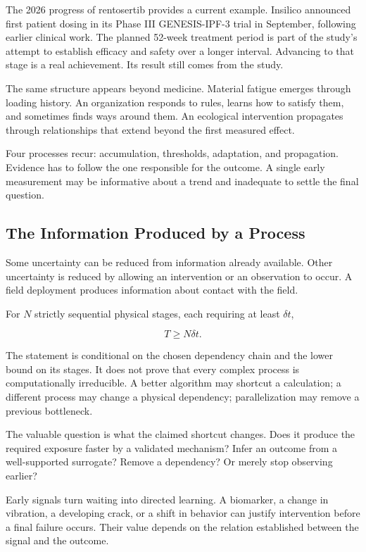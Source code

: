 \documentclass[11pt,openany]{book}
\begin{document}
The 2026 progress of rentosertib provides a current example. Insilico announced first patient dosing in its Phase III GENESIS-IPF-3 trial in September, following earlier clinical work. The planned 52-week treatment period is part of the study's attempt to establish efficacy and safety over a longer interval.\cite{insilico2026phase3} Advancing to that stage is a real achievement. Its result still comes from the study.

The same structure appears beyond medicine. Material fatigue emerges through loading history. An organization responds to rules, learns how to satisfy them, and sometimes finds ways around them. An ecological intervention propagates through relationships that extend beyond the first measured effect.

Four processes recur: accumulation, thresholds, adaptation, and propagation. Evidence has to follow the one responsible for the outcome. A single early measurement may be informative about a trend and inadequate to settle the final question.

\subsection{The Information Produced by a Process}

Some uncertainty can be reduced from information already available. Other uncertainty is reduced by allowing an intervention or an observation to occur. A field deployment produces information about contact with the field.

For $N$ strictly sequential physical stages, each requiring at least $\delta t$,

\begin{equation}
T\geq N\delta t.
\label{eq:steps}
\end{equation}

The statement is conditional on the chosen dependency chain and the lower bound on its stages. It does not prove that every complex process is computationally irreducible. A better algorithm may shortcut a calculation; a different process may change a physical dependency; parallelization may remove a previous bottleneck.

The valuable question is what the claimed shortcut changes. Does it produce the required exposure faster by a validated mechanism? Infer an outcome from a well-supported surrogate? Remove a dependency? Or merely stop observing earlier?

Early signals turn waiting into directed learning. A biomarker, a change in vibration, a developing crack, or a shift in behavior can justify intervention before a final failure occurs. Their value depends on the relation established between the signal and the outcome.
\end{document}
